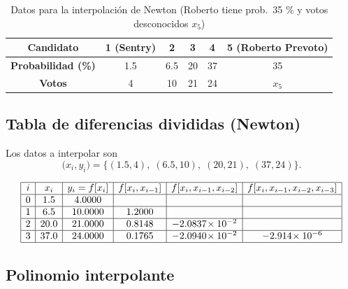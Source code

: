 \vspace{1ex}

\begin{table}[h]
    \centering
    \begin{tabular}{|c|c|c|c|c|c|}
        \hline
        \textbf{Candidato} & 1 (Sentry) & 2 & 3 & 4 & 5 (Roberto Prevoto) \\ \hline
        \textbf{Probabilidad (\%)} & 1.5 & 6.5 & 20 & 37 & 35 \\ \hline
        \textbf{Votos} & 4 & 10 & 21 & 24 & $x_5$ \\ \hline
    \end{tabular}
    \caption{Datos para la interpolación de Newton (Roberto tiene prob.\ 35 \% y votos desconocidos $x_5$)}
    \label{tab:prob_votos_5}
\end{table}

\subsection*{Tabla de diferencias divididas (Newton)}

Los datos a interpolar son  
\[
\bigl(x_i,y_i\bigr)=
\{(1.5,4),\;(6.5,10),\;(20,21),\;(37,24)\}.
\]

\[
\begin{array}{|c|c|c|c|c|c|}
\hline
i & x_i & y_i=f[x_i] & f[x_i,x_{i-1}] &
     f[x_i,x_{i-1},x_{i-2}] &
     f[x_i,x_{i-1},x_{i-2},x_{i-3}]\\ \hline
0 &  1.5 & 4.0000  &          &                      &                    \\ \hline
1 &  6.5 & 10.0000 & 1.2000   &                      &                    \\ \hline
2 & 20.0 & 21.0000 & 0.8148   & -2.0837\!\times10^{-2} &                    \\ \hline
3 & 37.0 & 24.0000 & 0.1765   & -2.0940\!\times10^{-2} & -2.914\!\times10^{-6} \\ \hline
\end{array}
\]
\vspace{1em}

\subsection*{Polinomio interpolante}

